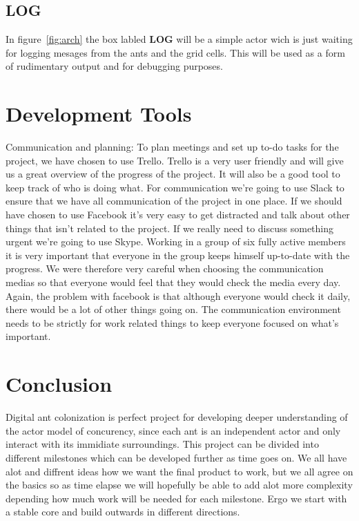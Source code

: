 \documentclass[a4paper]{article}
\begin{document}
\subsection{LOG}
In figure~\ref{fig:arch} the box labled \textbf{LOG} will be a simple actor wich
is just waiting for logging mesages from the ants and the grid cells. This will be
used as a form of rudimentary output and for debugging purposes.


\section{Development Tools}
Communication and planning: To plan meetings and set up to-do tasks for the
project, we have chosen to use Trello. Trello is a very user friendly and will
give us a great overview of the progress of the project. It will also be a good
tool to keep track of who is doing what. For communication we’re going to use
Slack to ensure that we have all communication of the project in one place. If
we should have chosen to use Facebook it’s very easy to get distracted and talk
about other things that isn’t related to the project. If we really need to discuss
something urgent we’re going to use Skype. Working in a group of six fully active members
it is very important that everyone in the group keeps himself up-to-date with the progress. 
We were therefore very careful when choosing the communication medias so that everyone would
feel that they would check the media every day. Again, the problem with facebook is that 
although everyone would check it daily, there would be a lot of other things going on.
The communication environment needs to be strictly for work related things to keep everyone
focused on what's important. 


\section{Conclusion}
Digital ant colonization is perfect project for developing deeper understanding
of the actor model of concurency, since each ant is an independent actor and
only interact with its immidiate surroundings. This project can be divided into
different milestones which can be developed further as time goes on. We all have
alot and diffrent ideas how we want the final product to work, but we all agree
on the basics so as time elapse we will hopefully be able to add alot more
complexity depending how much work will be needed for each milestone. Ergo we
start with a stable core and build outwards in different directions.
\end{document}

